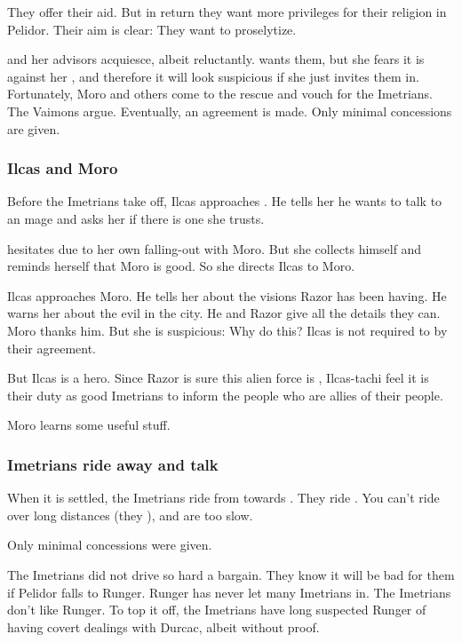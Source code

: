 They offer their aid. 
But in return they want more privileges for their religion in Pelidor. 
Their aim is clear: They want to proselytize. 

\Tiroco{} and her advisors acquiesce, albeit reluctantly. 
\Tiroco{} wants them, but she fears it is against her , and therefore it will look suspicious if she just invites them in. 
Fortunately, Moro and others come to the rescue and vouch for the Imetrians. 
The Vaimons argue. 
Eventually, an agreement is made. 
Only minimal concessions are given. 





\subsubsection{Ilcas and Moro}
Before the Imetrians take off, Ilcas approaches \Tiroco. 
He tells her he wants to talk to an \Ishrah{} mage and asks her if there is one she trusts. 

\Tiroco{} hesitates due to her own falling-out with Moro. 
But she collects himself and reminds herself that Moro is good. 
So she directs Ilcas to Moro. 

Ilcas approaches Moro. 
He tells her about the visions Razor has been having. 
He warns her about the evil in the city. 
He and Razor give all the details they can. 
Moro thanks him. 
But she is suspicious: Why do this? 
Ilcas is not required to by their agreement. 

But Ilcas is a hero. 
Since Razor is sure this alien force is , Ilcas-tachi feel it is their duty as good Imetrians to inform the people who are allies of their people. 

Moro learns some useful stuff. 





\subsubsection{Imetrians ride away and talk}
When it is settled, the Imetrians ride from \Malcur towards \Forclin. 
They ride \relcs. 
You can't ride \nycans{} over long distances (they ), and \mulgrons{} are too slow. 

Only minimal concessions were given. 

The Imetrians did not drive so hard a bargain. 
They know it will be bad for them if Pelidor falls to Runger. 
Runger has never let many Imetrians in. 
The Imetrians don't like Runger. 
To top it off, the Imetrians have long suspected Runger of having covert dealings with Durcac, albeit without proof. 

